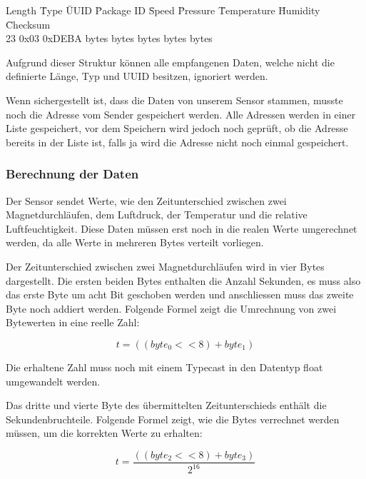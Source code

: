 \begin{tabbing}
   Length	\quad\= Type	\quad\= UUID 	\quad\= Package ID	\quad\= Speed	\quad\= Pressure	\quad\= Temperature	\quad\= Humidity	\quad\= Checksum   \\[0.8ex]
   23	\> 0x03	\> 0xDEBA  bytes bytes bytes bytes bytes \\
\end{tabbing}
Aufgrund dieser Struktur können alle empfangenen Daten, welche nicht die definierte Länge, Typ und UUID besitzen, ignoriert werden.

Wenn sichergestellt ist, dass die Daten von unserem Sensor stammen, musste noch die Adresse vom Sender gespeichert werden. Alle Adressen werden in einer Liste gespeichert, vor dem Speichern wird jedoch noch geprüft, ob die Adresse bereits in der Liste ist, falls ja wird die Adresse nicht noch einmal gespeichert.

\subsubsection{Berechnung der Daten}

Der Sensor sendet Werte, wie den Zeitunterschied zwischen zwei Magnetdurchläufen, dem Luftdruck, der Temperatur und die relative Luftfeuchtigkeit. Diese Daten müssen erst noch in die realen Werte umgerechnet werden, da alle Werte in mehreren Bytes verteilt vorliegen.

Der Zeitunterschied zwischen zwei Magnetdurchläufen wird in vier Bytes dargestellt. Die ersten beiden Bytes enthalten die Anzahl Sekunden, es muss also das erste Byte um acht Bit geschoben werden und anschliessen muss das zweite Byte noch addiert werden. Folgende Formel zeigt die Umrechnung von zwei Bytewerten in eine reelle Zahl:

\begin{equation}
	t = ((byte_0 << 8) + byte_1)
\end{equation}

Die erhaltene Zahl muss noch mit einem Typecast in den Datentyp float umgewandelt werden.

Das dritte und vierte Byte des übermittelten Zeitunterschieds enthält die Sekundenbruchteile. Folgende Formel zeigt, wie die Bytes verrechnet werden müssen, um die korrekten Werte zu erhalten:

\begin{equation}
	t = \frac{((byte_2 << 8) + byte_3)}{2^{16}}
\end{equation}

